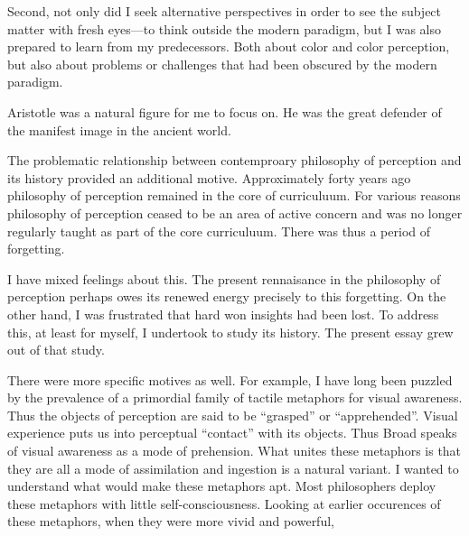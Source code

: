 Second, not only did I seek alternative perspectives in order to see the subject matter with fresh eyes---to think outside the modern paradigm, but I was also prepared to learn from my predecessors. Both about color and color perception, but also about problems or challenges that had been obscured by the modern paradigm. 

Aristotle was a natural figure for me to focus on. He was the great defender of the manifest image in the ancient world. 

The problematic relationship between contemproary philosophy of perception and its history provided an additional motive. Approximately forty years ago philosophy of perception remained in the core of curriculuum. For various reasons philosophy of perception ceased to be an area of active concern and was no longer regularly taught as part of the core curriculuum. There was thus a period of forgetting. 

I have mixed feelings about this. The present rennaisance in the philosophy of perception perhaps owes its renewed energy precisely to this forgetting. On the other hand, I was frustrated that hard won insights had been lost. To address this, at least for myself, I undertook to study its history. The present essay grew out of that study.

There were more specific motives as well. For example, I have long been puzzled by the prevalence of a primordial family of tactile metaphors for visual awareness. Thus the objects of perception are said to be ``grasped'' or ``apprehended''. Visual experience puts us into perceptual ``contact'' with its objects. Thus Broad speaks of visual awareness as a mode of prehension. What unites these metaphors is that they are all a mode of assimilation and ingestion is a natural variant. I wanted to understand what would make these metaphors apt. Most philosophers deploy these metaphors with little self-consciousness. Looking at earlier occurences of these metaphors, when they were more vivid and powerful, 

